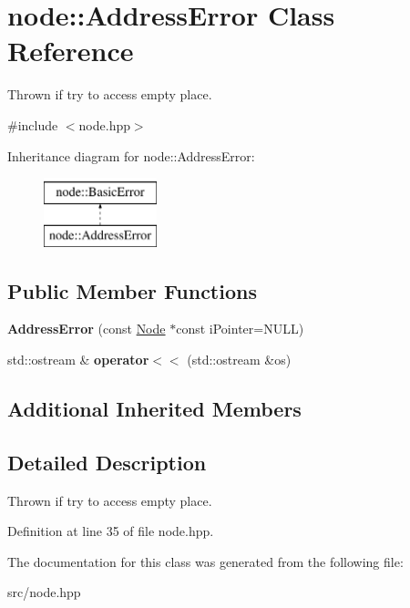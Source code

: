 \hypertarget{classnode_1_1AddressError}{\section{node\-:\-:Address\-Error Class Reference}
\label{classnode_1_1AddressError}
}


Thrown if try to access empty place.  




{\ttfamily \#include $<$node.\-hpp$>$}

Inheritance diagram for node\-:\-:Address\-Error\-:\begin{figure}[H]
\begin{center}
\leavevmode
\includegraphics[height=2.000000cm]{classnode_1_1AddressError}
\end{center}
\end{figure}
\subsection*{Public Member Functions}
\begin{DoxyCompactItemize}
\item 
\hypertarget{classnode_1_1AddressError_ac65a406163e7de2536cbf9c401a69fd8}{{\bfseries Address\-Error} (const \hyperlink{classnode_1_1Node}{Node} $\ast$const i\-Pointer=N\-U\-L\-L)}\label{classnode_1_1AddressError_ac65a406163e7de2536cbf9c401a69fd8}

\item 
\hypertarget{classnode_1_1AddressError_aee194bc336a02d1cbd36a4d53b569f5c}{std\-::ostream \& {\bfseries operator$<$$<$} (std\-::ostream \&os)}\label{classnode_1_1AddressError_aee194bc336a02d1cbd36a4d53b569f5c}

\end{DoxyCompactItemize}
\subsection*{Additional Inherited Members}


\subsection{Detailed Description}
Thrown if try to access empty place. 

Definition at line 35 of file node.\-hpp.



The documentation for this class was generated from the following file\-:\begin{DoxyCompactItemize}
\item 
src/node.\-hpp\end{DoxyCompactItemize}
